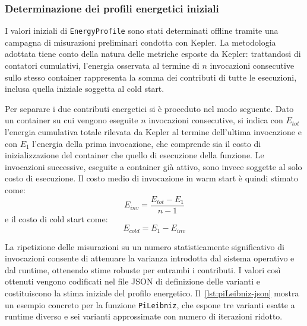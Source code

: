  
\subsubsection{Determinazione dei profili energetici iniziali}
\label{subsubsec:profili-iniziali}
 
I valori iniziali di \texttt{EnergyProfile} sono stati determinati
offline tramite una campagna di misurazioni preliminari condotta con
Kepler. La metodologia adottata tiene conto della natura delle metriche
esposte da Kepler: trattandosi di contatori cumulativi, l'energia
osservata al termine di $n$ invocazioni consecutive sullo stesso
container rappresenta la somma dei contributi di tutte le esecuzioni,
inclusa quella iniziale soggetta al cold start.
 
Per separare i due contributi energetici si è proceduto nel modo
seguente. Dato un container su cui vengono eseguite $n$ invocazioni
consecutive, si indica con $E_{tot}$ l'energia cumulativa totale
rilevata da Kepler al termine dell'ultima invocazione e con $E_1$
l'energia della prima invocazione, che comprende sia il costo di
inizializzazione del container che quello di esecuzione della funzione.
Le invocazioni successive, eseguite a container già attivo, sono invece
soggette al solo costo di esecuzione. Il costo medio di invocazione in
warm start è quindi stimato come:
\begin{equation}
    E_{inv} = \frac{E_{tot} - E_1}{n - 1}
    \label{eq:inv-joule}
\end{equation}
e il costo di cold start come:
\begin{equation}
    E_{cold} = E_1 - E_{inv}
    \label{eq:cold-joule}
\end{equation}
 
La ripetizione delle misurazioni su un numero statisticamente
significativo di invocazioni consente di attenuare la varianza
introdotta dal sistema operativo e dal runtime, ottenendo stime robuste
per entrambi i contributi. I valori così ottenuti vengono codificati nel
file JSON di definizione delle varianti e costituiscono la stima
iniziale del profilo energetico. Il~\autoref{lst:piLeibniz-json} mostra
un esempio concreto per la funzione \texttt{PiLeibniz}, che espone tre
varianti esatte a runtime diverso e sei varianti approssimate con numero
di iterazioni ridotto.
 
